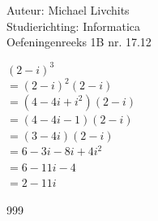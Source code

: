 \documentclass[a4paper]{article}
\begin{document}
  
\noindent \large Auteur: Michael Livchits \\
\noindent \large Studierichting: Informatica\\
\noindent \large Oefeningenreeks 1B nr. 17.12\\

\medskip

\normalsize

$ (2 - i)^3$\\

$ = (2 - i)^2(2 - i)$\\

$ = (4 - 4i + i^2)(2 - i)$\\

$ = (4 - 4i - 1)(2 - i)$\\

$ = (3 - 4i)(2 - i)$\\

$ = 6 - 3i - 8i + 4i^2$\\

$ = 6 - 11i - 4$\\

$ = 2 - 11i$\\


\begin{thebibliography}{999}
\end{thebibliography}
\end{document}
